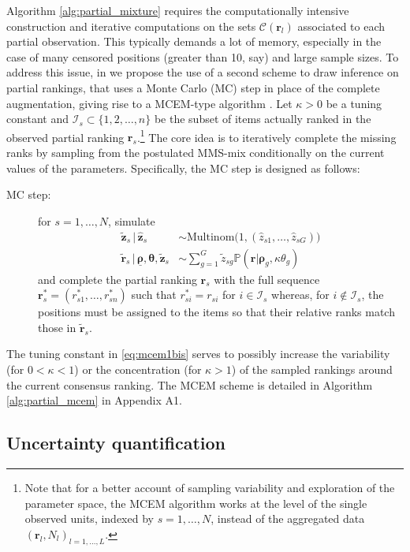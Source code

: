 Algorithm \ref{alg:partial_mixture} requires the computationally intensive construction and iterative computations on the sets $\mathcal{C}(\bm r_l)$ associated to each partial observation. This typically demands a lot of memory, especially in the case of many censored positions (greater than 10, say) and large sample sizes.
To address this issue, in  we propose the use of a second scheme to draw inference on partial rankings, that uses a Monte Carlo (MC) step in place of the complete augmentation, giving rise to a MCEM-type algorithm \citep{wei_tanner}. Let $\kappa > 0$ be a tuning constant and $\mathcal{I}_{s}\subset \{1,2,\dots,n\}$ be the subset of items actually ranked in the observed partial ranking $\bm{r}_s$.\footnote{Note that for a better account of sampling variability and exploration of the parameter space, the MCEM algorithm works at the level of the single observed units, indexed by $s=1,\dots,N$, instead of the aggregated data $(\bm r_l, N_l)_{l=1,\dots,L}$.} The core idea is to iteratively complete the missing ranks by sampling from the postulated MMS-mix conditionally on the current values of the parameters. Specifically, the MC step is designed as follows:
%
\begin{description}
\item[MC step:] for $s=1,\dots,N$, simulate
\begin{align}
\tilde{\bm{z}}_s\,\vert\,\hat{\bm{z}}_s&\sim\text{Multinom}\big(1,(\hat z_{s1},\dots,\hat z_{sG})\big) \label{eq:mcem1}\\
\tilde{\bm{r}}_s\,\vert\,\underline{\bm{\rho}},{\bm{\theta}},\tilde{\bm{z}}_s&\sim\sum_{g=1}^G\tilde{z}_{sg}\mathbb{P}\left(\bm{r}|\bm{\rho}_{g},\kappa\theta_{g}\right)
\label{eq:mcem1bis}\end{align}
and complete the partial ranking $\bm{r}_s$ with the full sequence $\bm{r}^*_s=(r^*_{s1},\dots,r^*_{sn})$ such that $r^*_{si}=r_{si}$ for $i\in\mathcal{I}_s$ whereas,
for $i\notin\mathcal{I}_s$, the positions must be assigned to the items so that their relative ranks match those in $\tilde{\bm{r}}_s$.
\end{description}
The tuning constant in \eqref{eq:mcem1bis} serves to possibly increase the variability (for $0<\kappa<1$) or the concentration (for $\kappa >1$) of the sampled rankings around the current consensus ranking. The MCEM scheme is detailed in Algorithm \ref{alg:partial_mcem} in Appendix A1.

\subsection{Uncertainty quantification}\label{ssec:uncertainty}

